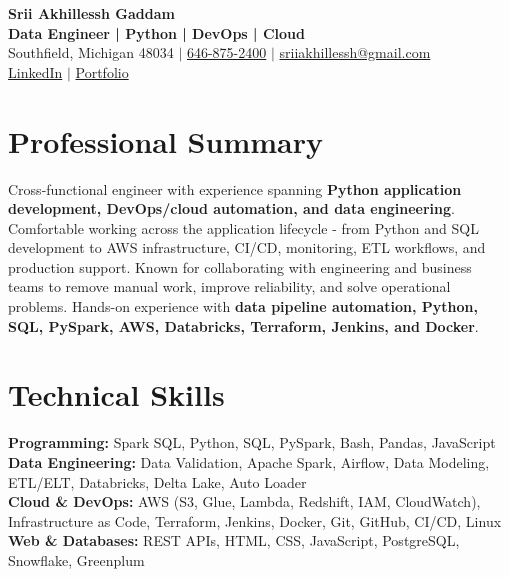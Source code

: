 \documentclass[letterpaper,10pt]{article}
\begin{document}
\fontsize{9.35pt}{10.45pt}\selectfont

\begin{center}
    {\LARGE \textbf{Srii Akhillessh Gaddam}} \\[-1pt]
    \textbf{Data Engineer | Python | DevOps | Cloud} \\[2pt]
    Southfield, Michigan 48034 $|$
    \href{tel:6468752400}{646-875-2400} $|$
    \href{mailto:sriiakhillessh@gmail.com}{sriiakhillessh@gmail.com} \\[1pt]
    \href{https://www.linkedin.com/in/srii-akhiilessh-gaddam-b48668191/}{LinkedIn} $|$
    \href{https://sriiakhillesshg.github.io/portfolio/}{Portfolio}
\end{center}
\vspace{-8pt}

\section{Professional Summary}
\small{Cross-functional engineer with experience spanning \textbf{Python application development, DevOps/cloud automation, and data engineering}. Comfortable working across the application lifecycle - from Python and SQL development to AWS infrastructure, CI/CD, monitoring, ETL workflows, and production support. Known for collaborating with engineering and business teams to remove manual work, improve reliability, and solve operational problems. Hands-on experience with \textbf{data pipeline automation, Python, SQL, PySpark, AWS, Databricks, Terraform, Jenkins, and Docker}.}

\section{Technical Skills}
\small{
\textbf{Programming:} Spark SQL, Python, SQL, PySpark, Bash, Pandas, JavaScript \\
\textbf{Data Engineering:} Data Validation, Apache Spark, Airflow, Data Modeling, ETL/ELT, Databricks, Delta Lake, Auto Loader \\
\textbf{Cloud \& DevOps:} AWS (S3, Glue, Lambda, Redshift, IAM, CloudWatch), Infrastructure as Code, Terraform, Jenkins, Docker, Git, GitHub, CI/CD, Linux \\
\textbf{Web \& Databases:} REST APIs, HTML, CSS, JavaScript, PostgreSQL, Snowflake, Greenplum
}
\end{document}
